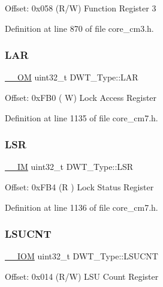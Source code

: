 Offset\+: 0x058 (R/W) Function Register 3 

Definition at line 870 of file core\+\_\+cm3.\+h.

\mbox{\label{struct_d_w_t___type_a4b8037802a3b25e367f0977d86f754ad}} 
\subsubsection{\texorpdfstring{L\+AR}{LAR}}
{\footnotesize\ttfamily \hyperlink{core__sc300_8h_a0ea2009ed8fd9ef35b48708280fdb758}{\+\_\+\+\_\+\+OM} uint32\+\_\+t D\+W\+T\+\_\+\+Type\+::\+L\+AR}

Offset\+: 0x\+F\+B0 ( W) Lock Access Register 

Definition at line 1135 of file core\+\_\+cm7.\+h.

\mbox{\label{struct_d_w_t___type_a4281befcc19ee69afdd50801cb1c9bcf}} 
\subsubsection{\texorpdfstring{L\+SR}{LSR}}
{\footnotesize\ttfamily \hyperlink{core__sc300_8h_a4cc1649793116d7c2d8afce7a4ffce43}{\+\_\+\+\_\+\+IM} uint32\+\_\+t D\+W\+T\+\_\+\+Type\+::\+L\+SR}

Offset\+: 0x\+F\+B4 (R ) Lock Status Register 

Definition at line 1136 of file core\+\_\+cm7.\+h.

\mbox{\label{struct_d_w_t___type_acc05d89bdb1b4fe2fa499920ec02d0b1}} 
\subsubsection{\texorpdfstring{L\+S\+U\+C\+NT}{LSUCNT}}
{\footnotesize\ttfamily \hyperlink{core__sc300_8h_ab6caba5853a60a17e8e04499b52bf691}{\+\_\+\+\_\+\+I\+OM} uint32\+\_\+t D\+W\+T\+\_\+\+Type\+::\+L\+S\+U\+C\+NT}

Offset\+: 0x014 (R/W) L\+SU Count Register 

